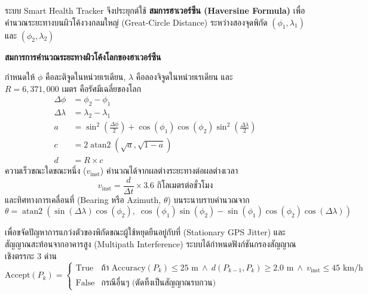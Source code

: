 ระบบ Smart Health Tracker จึงประยุกต์ใช้ \textbf{สมการฮาเวอร์ซีน (Haversine Formula)} เพื่อคำนวณระยะทางบนผิวโค้งวงกลมใหญ่ (Great-Circle Distance) ระหว่างสองจุดพิกัด $(\phi_1, \lambda_1)$ และ $(\phi_2, \lambda_2)$

\begin{theorybox}
\textbf{สมการการคำนวณระยะทางผิวโค้งโลกของฮาเวอร์ซีน}

กำหนดให้ $\phi$ คือละติจูดในหน่วยเรเดียน, $\lambda$ คือลองจิจูดในหน่วยเรเดียน และ $R = 6{,}371{,}000\text{ เมตร}$ คือรัศมีเฉลี่ยของโลก
\begin{align}
\Delta \phi &= \phi_2 - \phi_1 \\
\Delta \lambda &= \lambda_2 - \lambda_1 \\
a &= \sin^2\left(\frac{\Delta \phi}{2}\right) + \cos(\phi_1)\cos(\phi_2)\sin^2\left(\frac{\Delta \lambda}{2}\right) \\
c &= 2 \operatorname{atan2}\left(\sqrt{a}, \sqrt{1-a}\right) \\
d &= R \times c
\end{align}
ความเร็วขณะใดขณะหนึ่ง ($v_{\text{inst}}$) คำนวณได้จากผลต่างระยะทางต่อผลต่างเวลา
\begin{equation}
v_{\text{inst}} = \frac{d}{\Delta t} \times 3.6\text{ กิโลเมตรต่อชั่วโมง}
\end{equation}
และทิศทางการเคลื่อนที่ (Bearing หรือ Azimuth, $\theta$) บนระนาบราบคำนวณจาก
\begin{equation}
\theta = \operatorname{atan2}\left(\sin(\Delta \lambda)\cos(\phi_2), \; \cos(\phi_1)\sin(\phi_2) - \sin(\phi_1)\cos(\phi_2)\cos(\Delta \lambda)\right)
\end{equation}
\end{theorybox}

เพื่อขจัดปัญหาการแกว่งตัวของพิกัดขณะผู้ใช้หยุดยืนอยู่กับที่ (Stationary GPS Jitter) และสัญญาณสะท้อนจากอาคารสูง (Multipath Interference) ระบบได้กำหนดฟังก์ชันกรองสัญญาณเชิงตรรกะ 3 ด่าน
\begin{equation}
\text{Accept}(P_k) = 
\begin{cases}
\text{True} & \text{ถ้า } \text{Accuracy}(P_k) \le 25\text{ m} \ \land \ d(P_{k-1}, P_k) \ge 2.0\text{ m} \ \land \ v_{\text{inst}} \le 45\text{ km/h} \\
\text{False} & \text{กรณีอื่นๆ (ตัดทิ้งเป็นสัญญาณรบกวน)}
\end{cases}
\end{equation}

